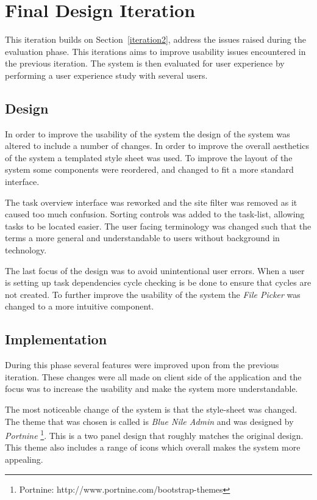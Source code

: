 \documentclass[12pt,a4paper]{report}
\begin{document}
\section{Final Design Iteration\label{iteration3}}
This iteration builds on Section~\ref{iteration2}, address the issues raised during the evaluation
phase. This iterations aims to improve usability issues encountered in the previous iteration. The
system is then evaluated for user experience by performing a user experience study with several users.
\subsection{Design}
In order to improve the usability of the system the design of the system was altered to include a
number of changes. In order to improve the overall aesthetics of the system a templated style sheet
was used. To improve the layout of the system some components were  reordered, and
changed to fit a more standard interface.

The task overview interface was reworked and the site filter was removed as it caused too
much confusion. Sorting controls was added to the task-list, allowing tasks to be located
easier. The user facing terminology was changed such that the terms a more general
and understandable to users without background in technology.

The last focus of the design was to avoid unintentional user errors.
When a user is setting up task dependencies cycle checking is be done to ensure that cycles
are not created. To further improve the usability of the system the \emph{File
Picker} was changed to a more intuitive component.

\subsection{Implementation}

During this phase several features were improved upon from the previous iteration.
These changes were all made on client side of the application and the focus was
to increase the usability and make the system more understandable.

The most noticeable change of the system is that the style-sheet was changed. The theme that
was chosen is called is \emph{Blue Nile Admin} and was designed by \emph{Portnine}
\footnote{Portnine: http://www.portnine.com/bootstrap-themes}. This is a two panel design
that roughly matches the original design. This theme also includes a range of icons which
overall makes the system more appealing.
\end{document}
